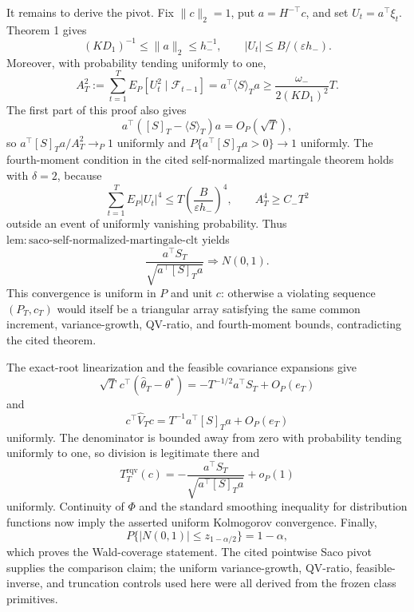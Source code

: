 It remains to derive the pivot. Fix \(\|c\|_2=1\), put \(a=H^{-\top}c\), and set \(U_t=a^\top\xi_t\). Theorem 1 gives
\[
 (KD_1)^{-1}\le\|a\|_2\le h_-^{-1},
 \qquad |U_t|\le B/(\varepsilon h_-).
\]
Moreover, with probability tending uniformly to one,
\[
 A_T^2:=\sum_{t=1}^TE_P[U_t^2\mid\mathcal F_{t-1}]
 =a^\top\langle S\rangle_Ta
 \ge\frac{\omega_-}{2(KD_1)^2}T.
\]
The first part of this proof also gives
\[
 a^\top([S]_T-\langle S\rangle_T)a=O_P(\sqrt T),
\]
so \(a^\top[S]_Ta/A_T^2\to_P1\) uniformly and \(P\{a^\top[S]_Ta>0\}\to1\) uniformly. The fourth-moment condition in the cited self-normalized martingale theorem holds with \(\delta=2\), because
\[
 \sum_{t=1}^TE_P|U_t|^4\le T\left(\frac{B}{\varepsilon h_-}\right)^4,
 \qquad A_T^4\ge C_-T^2
\]
outside an event of uniformly vanishing probability. Thus \(\mathrm{lem:saco\text{-}self\text{-}normalized\text{-}martingale\text{-}clt}\) yields
\[
 \frac{a^\top S_T}{\sqrt{a^\top[S]_Ta}}\Rightarrow N(0,1).
\]
This convergence is uniform in \(P\) and unit \(c\): otherwise a violating sequence \((P_T,c_T)\) would itself be a triangular array satisfying the same common increment, variance-growth, QV-ratio, and fourth-moment bounds, contradicting the cited theorem.

The exact-root linearization and the feasible covariance expansions give
\[
 \sqrt T\,c^\top(\widehat\theta_T-\theta^*)
 =-T^{-1/2}a^\top S_T+O_P(e_T)
\]
and
\[
 c^\top\widehat V_Tc=T^{-1}a^\top[S]_Ta+O_P(e_T)
\]
uniformly. The denominator is bounded away from zero with probability tending uniformly to one, so division is legitimate there and
\[
 T_T^{\mathrm{rqv}}(c)
 =-\frac{a^\top S_T}{\sqrt{a^\top[S]_Ta}}+o_P(1)
\]
uniformly. Continuity of \(\Phi\) and the standard smoothing inequality for distribution functions now imply the asserted uniform Kolmogorov convergence. Finally,
\[
 P\{|N(0,1)|\le z_{1-\alpha/2}\}=1-\alpha,
\]
which proves the Wald-coverage statement. The cited pointwise Saco pivot supplies the comparison claim; the uniform variance-growth, QV-ratio, feasible-inverse, and truncation controls used here were all derived from the frozen class primitives.
